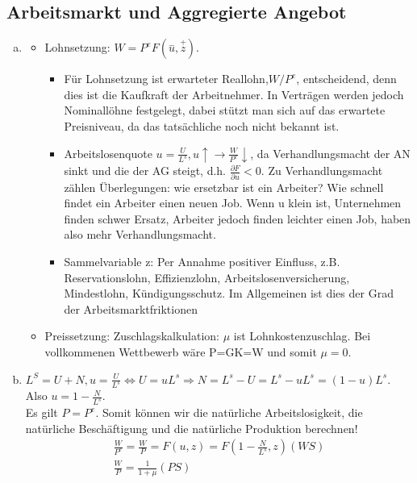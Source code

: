\documentclass{scrartcl}
\begin{document}
\subsection{Arbeitsmarkt und Aggregierte Angebot}
\begin{enumerate}[a)]
  \item \begin{itemize}
    \item Lohnsetzung: $W=P^e F(\overset{-}{u},\overset{+}{z})$.
    \begin{itemize}
    \item F\"{u}r Lohnsetzung ist erwarteter Reallohn,$W/P^e$, entscheidend, denn dies ist die Kaufkraft der Arbeitnehmer. In Vertr\"{a}gen werden jedoch Nominall\"{o}hne festgelegt, dabei st\"{u}tzt man sich auf das erwartete Preisniveau, da das tats\"{a}chliche noch nicht bekannt ist.
    \item Arbeitslosenquote $u = \frac{U}{L^s}, u\uparrow \rightarrow \frac{W}{P^e}\downarrow$, da Verhandlungsmacht der AN sinkt und die der AG steigt, d.h. $\frac{\partial F}{\partial u}<0$. Zu Verhandlungsmacht z\"{a}hlen \"{U}berlegungen: wie ersetzbar ist ein Arbeiter? Wie schnell findet ein Arbeiter einen neuen Job. Wenn u klein ist, Unternehmen finden schwer Ersatz, Arbeiter jedoch finden leichter einen Job, haben also mehr Verhandlungsmacht.
    \item Sammelvariable z: Per Annahme positiver Einfluss, z.B. Reservationslohn, Effizienzlohn, Arbeitslosenversicherung, Mindestlohn, K\"{u}ndigungsschutz. Im Allgemeinen ist dies der Grad der Arbeitsmarktfriktionen
  \end{itemize}
  \item Preissetzung: Zuschlagskalkulation: $\mu$ ist Lohnkostenzuschlag. Bei vollkommenen Wettbewerb w\"{a}re P=GK=W und somit $\mu=0$.
  \end{itemize}
  \item $L^S = U + N, u = \frac{U}{L^s} \Leftrightarrow U = u L^s \Rightarrow N = L^s - U = L^s - uL^s = (1-u)L^s$. Also $u=1 - \frac{N}{L^s}.$\\
  Es gilt $P=P^e$. Somit k\"{o}nnen wir die nat\"{u}rliche Arbeitslosigkeit, die nat\"{u}rliche Besch\"{a}ftigung und die nat\"{u}rliche Produktion berechnen!
  \begin{align*}
    \frac{W}{P^e} = \frac{W}{P} = F(u,z) = F\left(1 - \frac{N}{L^s},z\right) (WS)\\
    \frac{W}{P} = \frac{1}{1+\mu} (PS)
  \end{align*}
\begin{center}

\end{center}
\end{enumerate}
\end{document}
